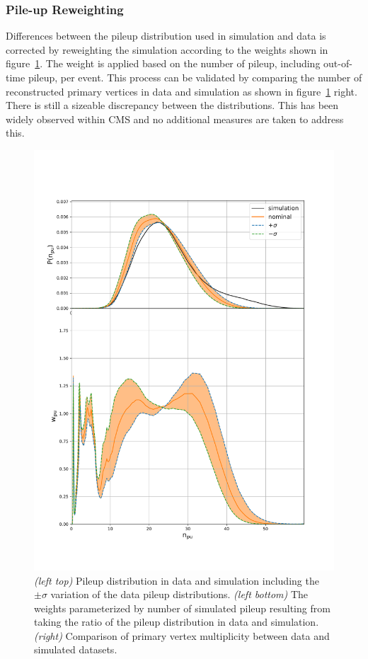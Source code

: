 \subsubsection{Pile-up Reweighting}
Differences between the pileup distribution used in simulation and data is corrected by reweighting the simulation according to the weights shown in figure~\ref{fig:analysis:calibration:pileup}. The weight is applied based on the number of pileup, including out-of-time pileup, per event.  This process can be validated by comparing the number of reconstructed primary vertices in data and simulation as shown in figure~\ref{fig:analysis:calibration:pileup} right. There is still a sizeable discrepancy between the distributions. This has been widely observed within CMS and no additional measures are taken to address this.
\begin{figure}[ht]
    \centering
    \includegraphics[height=0.4\textheight]{chapters/Analysis/sectionCalibration/figures/generator/pileup_systematics}
    \caption{\emph{(left top)} Pileup distribution in data and simulation including the $\pm\sigma$ variation of the data pileup distributions. \emph{(left bottom)} The weights parameterized by number of simulated pileup resulting from taking the ratio of the pileup distribution in data and simulation. \emph{(right)} Comparison of primary vertex multiplicity between data and simulated datasets. }
    \label{fig:analysis:calibration:pileup}
\end{figure}
\FloatBarrier



